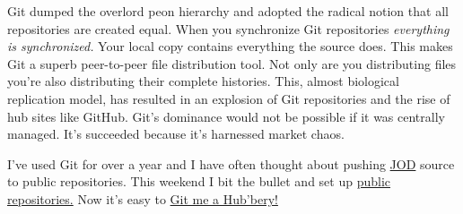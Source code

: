 Git dumped the overlord peon hierarchy and adopted the radical notion
that all repositories are created equal. When you synchronize Git
repositories \emph{everything is synchronized.} Your local copy contains
everything the source does. This makes Git a superb peer-to-peer file
distribution tool. Not only are you distributing files you're also
distributing their complete histories. This, almost biological
replication model, has resulted in an explosion of Git repositories and
the rise of hub sites like GitHub. Git's dominance would not be possible
if it was centrally managed. It's succeeded because it's harnessed
market chaos.

I've used Git for over a year and I have often thought about pushing
\href{http://bakerjd99.wordpress.com/the-jod-page/}{JOD} source to
public repositories. This weekend I bit the bullet and set up
\href{https://github.com/bakerjd99}{public repositories.} Now it's easy
to \href{http://www.youtube.com/watch?v=2UbtcmjfKa8}{Git me a Hub'bery!}



%